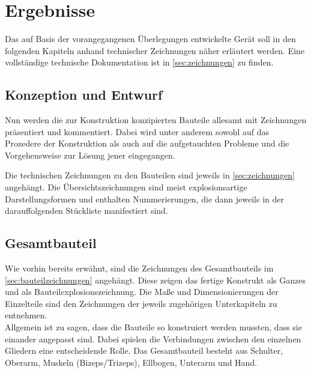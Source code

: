 \chapter{Ergebnisse}
	Das auf Basis der vorangegangenen Überlegungen entwickelte Gerät soll in den folgenden Kapiteln anhand technischer Zeichnungen näher erläutert werden.
	Eine vollständige technische Dokumentation ist in \cref{sec:zeichnungen} zu finden.
	\section{Konzeption und Entwurf}
		Nun werden die zur Konstruktion konzipierten Bauteile allesamt mit Zeichnungen präsentiert und kommentiert.
		Dabei wird unter anderem sowohl auf das Prozedere der Konstruktion als auch auf die aufgetauchten Probleme und die Vorgehensweise zur Lösung jener eingegangen.\par
		Die technischen Zeichnungen zu den Bauteilen sind jeweils in \cref{sec:zeichnungen} angehängt.
		Die Übersichtszeichnungen sind meist explosionsartige Darstellungsformen und enthalten Nummerierungen, die dann jeweils in der darauffolgenden Stückliste manifestiert sind.
		
	\section{Gesamtbauteil}
		Wie vorhin bereits erwähnt, sind die Zeichnungen des Gesamtbauteils im \cref{sec:bauteilzeichnungen} angehängt.
		Diese zeigen das fertige Konstrukt als Ganzes und als Bauteilexplosionszeichnung.
		Die Maße und Dimensionierungen der Einzelteile sind den Zeichnungen der jeweils zugehörigen Unterkapiteln zu entnehmen.\\
		Allgemein ist zu sagen, dass die Bauteile so konstruiert werden mussten, dass sie einander angepasst sind.
		Dabei spielen die Verbindungen zwischen den einzelnen Gliedern eine entscheidende Rolle.
		Das Gesamtbauteil besteht aus Schulter, Oberarm, Muskeln (Bizeps/Trizeps), Ellbogen, Unterarm und Hand.
	
